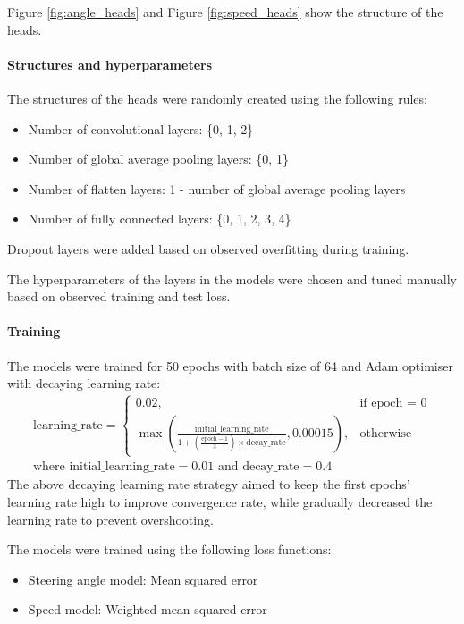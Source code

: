 \documentclass{article}
\begin{document}
Figure \ref{fig:angle_heads} and Figure \ref{fig:speed_heads} show the structure of the heads.

\paragraph{Structures and hyperparameters}
The structures of the heads were randomly created using the following rules:
\begin{itemize}
  \item Number of convolutional layers: \{0, 1, 2\}
  \item Number of global average pooling layers: \{0, 1\}
  \item Number of flatten layers: 1 - number of global average pooling layers
  \item Number of fully connected layers: \{0, 1, 2, 3, 4\}
\end{itemize}
Dropout layers were added based on observed overfitting during training.

The hyperparameters of the layers in the models were chosen and tuned manually based on observed training and test loss.

\paragraph{Training}

The models were trained for 50 epochs with batch size of 64 and Adam optimiser with decaying learning rate:
\[
  \begin{aligned}
    \text{learning\_rate} =
    \begin{cases}
      0.02,                                                                                                         & \text{if epoch = 0}
      \\
      \max\left(\frac{\text{initial\_learning\_rate}}{1 + \left(\frac{\text{epoch} - 1}{3}\right) \times \text{decay\_rate}}, 0.00015\right), & \text{otherwise}
    \end{cases}
    \\
    \text{where } \text{initial\_learning\_rate} = 0.01 \text{ and } \text{decay\_rate} = 0.4
  \end{aligned}
\]
The above decaying learning rate strategy aimed to keep the first epochs' learning rate high to improve convergence rate, while gradually decreased the learning rate to prevent overshooting.

The models were trained using the following loss functions:
\begin{itemize}
  \item Steering angle model: Mean squared error
  \item Speed model: Weighted mean squared error
\end{itemize}
\end{document}
